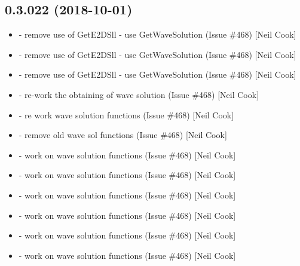 \documentclass[a4paper,10pt,english]{report}
\begin{document}
\subsection{0.3.022 (2018-10-01)}
\label{\detokenize{misc/changelog:id309}}\begin{itemize}
\item {} 
 - remove use of GetE2DSll - use
GetWaveSolution (Issue \#468) {[}Neil Cook{]}

\item {} 
 - remove use of GetE2DSll - use GetWaveSolution (Issue
\#468) {[}Neil Cook{]}

\item {} 
 - remove use of GetE2DSll - use GetWaveSolution
(Issue \#468) {[}Neil Cook{]}

\item {} 
 - re-work the obtaining of wave solution (Issue \#468)
{[}Neil Cook{]}

\item {} 
 - re work wave solution functions (Issue \#468) {[}Neil
Cook{]}

\item {} 
 - remove old wave sol functions (Issue \#468)
{[}Neil Cook{]}

\item {} 
 - work on wave solution functions (Issue \#468)
{[}Neil Cook{]}

\item {} 
 - work on wave solution functions (Issue \#468) {[}Neil
Cook{]}

\item {} 
 - work on wave solution functions (Issue
\#468) {[}Neil Cook{]}

\item {} 
 - work on wave solution functions (Issue \#468)
{[}Neil Cook{]}

\item {} 
 - work on wave solution functions (Issue \#468)
{[}Neil Cook{]}

\item {} 
 - work on wave solution functions (Issue \#468)
{[}Neil Cook{]}


\end{itemize}
\end{document}
